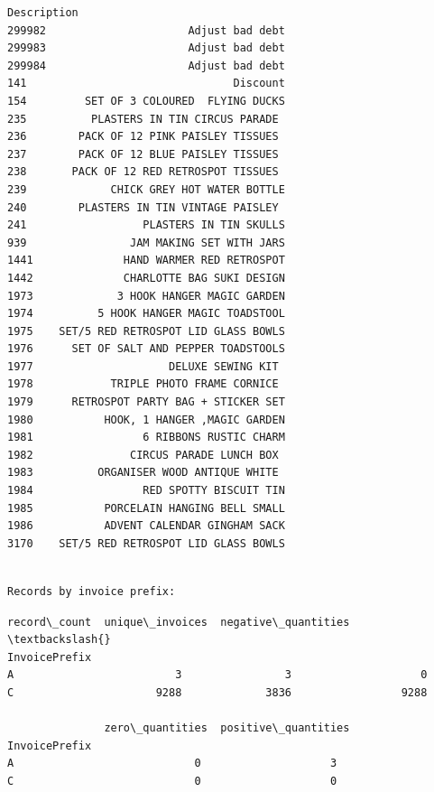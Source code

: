 \documentclass[11pt]{article}
\begin{document}
\begin{Verbatim}[commandchars=\\\{\}]
                                Description  
299982                      Adjust bad debt  
299983                      Adjust bad debt  
299984                      Adjust bad debt  
141                                Discount  
154         SET OF 3 COLOURED  FLYING DUCKS  
235          PLASTERS IN TIN CIRCUS PARADE   
236        PACK OF 12 PINK PAISLEY TISSUES   
237        PACK OF 12 BLUE PAISLEY TISSUES   
238       PACK OF 12 RED RETROSPOT TISSUES   
239             CHICK GREY HOT WATER BOTTLE  
240        PLASTERS IN TIN VINTAGE PAISLEY   
241                  PLASTERS IN TIN SKULLS  
939                JAM MAKING SET WITH JARS  
1441              HAND WARMER RED RETROSPOT  
1442              CHARLOTTE BAG SUKI DESIGN  
1973             3 HOOK HANGER MAGIC GARDEN  
1974          5 HOOK HANGER MAGIC TOADSTOOL  
1975    SET/5 RED RETROSPOT LID GLASS BOWLS  
1976      SET OF SALT AND PEPPER TOADSTOOLS  
1977                     DELUXE SEWING KIT   
1978            TRIPLE PHOTO FRAME CORNICE   
1979      RETROSPOT PARTY BAG + STICKER SET  
1980           HOOK, 1 HANGER ,MAGIC GARDEN  
1981                 6 RIBBONS RUSTIC CHARM  
1982               CIRCUS PARADE LUNCH BOX   
1983          ORGANISER WOOD ANTIQUE WHITE   
1984                 RED SPOTTY BISCUIT TIN  
1985           PORCELAIN HANGING BELL SMALL  
1986           ADVENT CALENDAR GINGHAM SACK  
3170    SET/5 RED RETROSPOT LID GLASS BOWLS  
    \end{Verbatim}

    
    \begin{Verbatim}[commandchars=\\\{\}]

Records by invoice prefix:
    \end{Verbatim}

    
    \begin{Verbatim}[commandchars=\\\{\}]
               record\_count  unique\_invoices  negative\_quantities  \textbackslash{}
InvoicePrefix                                                       
A                         3                3                    0   
C                      9288             3836                 9288   

               zero\_quantities  positive\_quantities  
InvoicePrefix                                        
A                            0                    3  
C                            0                    0  
    \end{Verbatim}
\end{document}
